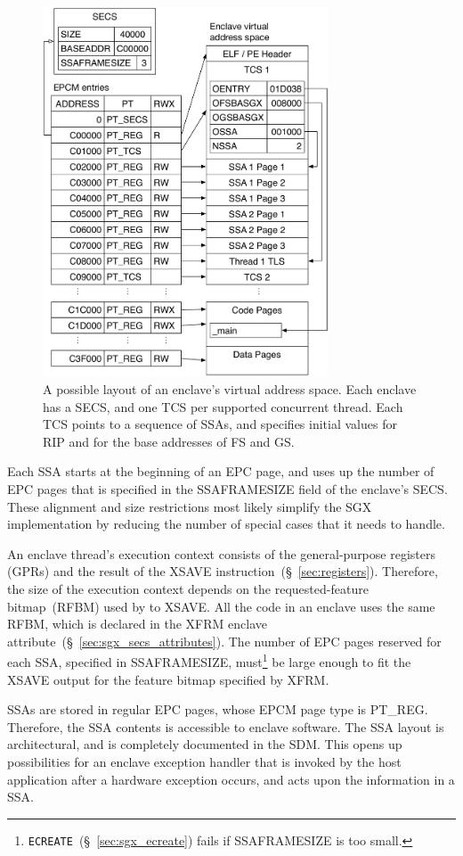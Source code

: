 \begin{figure}[hbt]
  \centering
  \includegraphics[width=85mm]{figures/sgx_enclave_layout.pdf}
  \caption{
    A possible layout of an enclave's virtual address space. Each enclave has a
    SECS, and one TCS per supported concurrent thread. Each TCS points to a
    sequence of SSAs, and specifies initial values for RIP and for the base
    addresses of FS and GS.
  }
  \label{fig:sgx_enclave_layout}
\end{figure}

Each SSA starts at the beginning of an EPC page, and uses up the number of EPC
pages that is specified in the SSAFRAMESIZE field of the enclave's SECS. These
alignment and size restrictions most likely simplify the SGX implementation by
reducing the number of special cases that it needs to handle.


An enclave thread's execution context consists of the general-purpose registers
(GPRs) and the result of the XSAVE instruction~(\S~\ref{sec:registers}).
Therefore, the size of the execution context depends on the requested-feature
bitmap~(RFBM) used by to XSAVE. All the code in an enclave uses the same RFBM,
which is declared in the XFRM enclave
attribute~(\S~\ref{sec:sgx_secs_attributes}). The number of EPC pages reserved
for each SSA, specified in SSAFRAMESIZE,
must\footnote{\texttt{ECREATE}~(\S~\ref{sec:sgx_ecreate}) fails if SSAFRAMESIZE
is too small.} be large enough to fit the XSAVE output for the feature bitmap
specified by XFRM.

SSAs are stored in regular EPC pages, whose EPCM page type is PT\_REG.
Therefore, the SSA contents is accessible to enclave software. The SSA layout
is architectural, and is completely documented in the SDM. This opens up
possibilities for an enclave exception handler that is invoked by the host
application after a hardware exception occurs, and acts upon the information in
a SSA.

